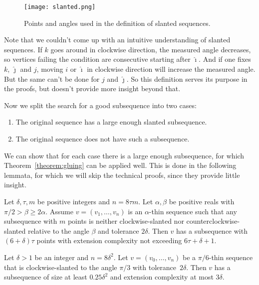 \begin{figure}[ht]
  \centering
  \texttt{[image: slanted.png]}
  \caption{Points and angles used in the definition of slanted sequences.}
  \label{fig:slanted}
\end{figure}

Note that we couldn't come up with an intuitive understanding of slanted sequences. If $k$ goes around in clockwise direction, the measured angle decreases, so vertices failing the condition are consecutive starting after $\hat{\imath}$. And if one fixes $k$, $\hat{\jmath}$ and $j$, moving $i$ or $\hat{\imath}$ in clockwise direction will increase the measured angle. But the same can't be done for $j$ and $\hat{\jmath}$. So this definition serves its purpose in the proofs, but doesn't provide more insight beyond that.

Now we split the search for a good subsequence into two cases:
\begin{enumerate}
  \item The original sequence has a large enough slanted subsequence.
  \item The original sequence does not have such a subsequence.
\end{enumerate}

We can show that for each case there is a large enough subsequence, for which Theorem~\ref{theorem:gluing} can be applied well. This is done in the following lemmata, for which we will skip the technical proofs, since they provide little insight.

\begin{lemma}\label{lemma:unslanted-subseqence}
  Let $\delta, \tau, m$ be positive integers and $n=8\tau m$. Let $\alpha,\beta$ be positive reals with $\pi/2>\beta\geq 2\alpha$. Assume $v=(v_1,\dots,v_n)$ is an $\alpha$-thin sequence such that any subsequence with $m$ points is neither clockwise-slanted nor counterclockwise-slanted relative to the angle $\beta$ and tolerance $2\delta$. Then $v$ has a subsequence with $(6+\delta)\tau$ points with extension complexity not exceeding $6\tau+\delta+1$.
\end{lemma}

\begin{lemma}\label{lemma:slanted-subsequence}
  Let $\delta>1$ be an integer and $n=8\delta^2$. Let $v=(v_0,\ldots,v_n)$ be a $\pi/6$-thin sequence that is clockwise-slanted to the angle $\pi/3$ with tolerance~$2\delta$. Then $v$ has a subsequence of size at least $0.25\delta^2$ and extension complexity at most $3\delta$.
\end{lemma}

